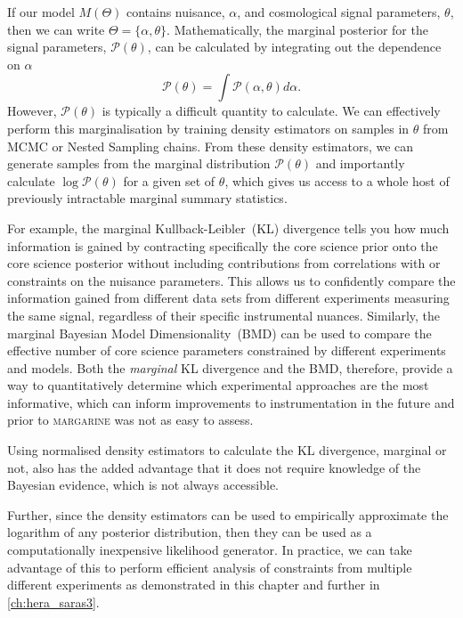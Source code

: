 If our model $M (\Theta)$ contains nuisance, $\alpha$, and cosmological signal parameters, $\theta$, then we can write $\Theta = \{\alpha, \theta\}$. Mathematically, the marginal posterior for the signal parameters, $\mathcal{P}(\theta)$, can be calculated by integrating out the dependence on $\alpha$
\begin{equation}
    \mathcal{P}(\theta) = \int \mathcal{P}(\alpha, \theta) d \alpha.
    \label{eq:marginal_posterior}
\end{equation}
However, $\mathcal{P}(\theta)$ is typically a difficult quantity to calculate. We can effectively perform this marginalisation by training density estimators on samples in $\theta$ from MCMC or Nested Sampling chains. From these density estimators, we can generate samples from the marginal distribution $\mathcal{P}(\theta)$ and importantly calculate $\log \mathcal{P}(\theta)$ for a given set of $\theta$, which gives us access to a whole host of previously intractable marginal summary statistics.

For example, the marginal Kullback-Leibler~(KL) divergence tells you how much information is gained by contracting specifically the core science prior onto the core science posterior without including contributions from correlations with or constraints on the nuisance parameters. This allows us to confidently compare the information gained from different data sets from different experiments measuring the same signal, regardless of their specific instrumental nuances. Similarly, the marginal Bayesian Model Dimensionality~(BMD) can be used to compare the effective number of core science parameters constrained by different experiments and models. Both the \emph{marginal} KL divergence and the BMD, therefore, provide a way to quantitatively determine which experimental approaches are the most informative, which can inform improvements to instrumentation in the future and prior to \textsc{margarine} was not as easy to assess.

Using normalised density estimators to calculate the KL divergence, marginal or not, also has the added advantage that it does not require knowledge of the Bayesian evidence, which is not always accessible.

Further, since the density estimators can be used to empirically approximate the logarithm of any posterior distribution, then they can be used as a computationally inexpensive likelihood generator. In practice, we can take advantage of this to perform efficient analysis of constraints from multiple different experiments as demonstrated in this chapter and further in \cref{ch:hera_saras3}.

